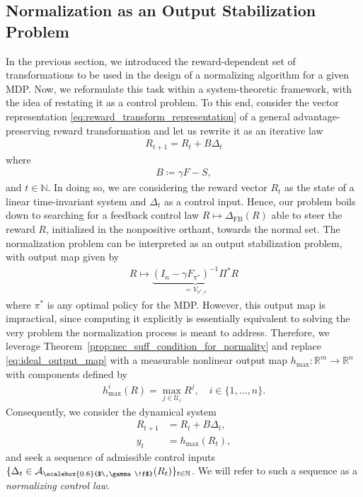 \documentclass[10pt,leqno]{amsart}
\newcommand{\sml}{\scriptscriptstyle}
\newcommand{\R}{\mathbb{R}}
\newcommand{\N}{\mathbb{N}}
\newcommand{\U}{\mathcal{U}}
\newcommand{\cost}{r}
\newcommand{\Vsym}{V}
\newcommand{\Varg}[1]{\Vsym_{#1}}
\newcommand{\Cost}{R}
\newcommand{\f}{f}
\newcommand{\F}{F}
\newcommand{\Ffb}[1]{\F_{#1}}
\newcommand{\policy}{\pi}
\newcommand{\disc}{\gamma}
\newcommand{\feasset}[1]{\mathcal{A}_{\scalebox{0.6}{$\,\disc\!\f$}}(#1)}
\newcommand{\Proj}{S}
\newcommand{\B}{B}
\newcommand{\outmap}{h_{\sml \text{max}}}
\begin{document}
\subsection{Normalization as an Output Stabilization Problem}
\label{subsec:section_2A}
In the previous section, we introduced the reward-dependent set of transformations to be used in the design of a normalizing algorithm for a given MDP. Now, we reformulate this task within a system-theoretic framework, with the idea of restating it as a control problem. To this end, consider the vector representation \eqref{eq:reward_transform_representation} of a general advantage-preserving reward transformation and let us rewrite it as an iterative law
\begin{align}\label{eq:reward_transform_system}
    \Cost_{t+1} = \Cost_t + \B \Delta_t
\end{align}
where
\begin{align}\label{eq:input_matrix}
    \B \coloneqq \disc \F - \Proj,
\end{align}
and $t \in \N$. In doing so, we are considering the reward vector $\Cost_t$ as the state of a linear time-invariant system and $\Delta_t$ as a control input. Hence, our problem boils down to searching for a feedback control law $\Cost \mapsto \Delta_{\sml \text{FB}}(\Cost)$ able to steer the reward $\Cost$, initialized in the nonpositive orthant, towards the normal set. The normalization problem can be interpreted as an output stabilization problem, with output map given by
    \begin{align}
    \Cost \mapsto \underbrace{(I_n - \disc \Ffb{\policy^*})^{-1} \Pi^* \Cost}_{= \Varg{\policy^*\!, \cost}} \label{eq:ideal_output_map}
\end{align}
where $\policy^*$ is any optimal policy for the MDP. However, this output map is impractical, since computing it explicitly is essentially equivalent to solving the very problem the normalization process is meant to address. Therefore, we leverage Theorem~\ref{prop:nec_suff_condition_for_normality} and replace \eqref{eq:ideal_output_map} with a measurable nonlinear output map $\outmap : \R^m \to \R^n$ with components defined by
\begin{align}\label{eq:output_regulation_implicit}
    \outmap^i(\Cost) = \max_{j \in \U_i} \Cost^j, \quad i \in \{1, \hdots, n\}.
\end{align}
Consequently, we consider the dynamical system
\begin{subequations}\label{eq:system_dynamics}
    \begin{align}
        \Cost_{t+1} &= \Cost_t + \B \Delta_t,\\
        y_t &= \outmap(\Cost_t),
    \end{align}
\end{subequations}
and seek a sequence of admissible control inputs $\{\Delta_t \in \feasset{\Cost_t}\}_{t \in \N}$. We will refer to such a sequence as a \emph{normalizing control law}. 
\end{document}
